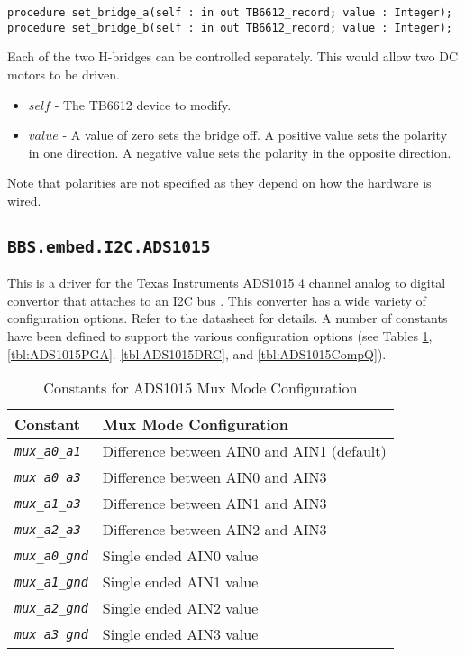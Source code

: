 \documentclass[10pt, openany]{book}
\newcommand{\package}[1]{\texttt{#1}}
\newcommand{\constant}[1]{\emph{\texttt{#1}}}
\begin{document}
\begin{lstlisting}
procedure set_bridge_a(self : in out TB6612_record; value : Integer);
procedure set_bridge_b(self : in out TB6612_record; value : Integer);
\end{lstlisting}
Each of the two H-bridges can be controlled separately.  This would allow two DC motors to be driven.
\begin{itemize}
  \item $self$ - The TB6612 device to modify.
  \item $value$ - A value of zero sets the bridge off.  A positive value sets the polarity in one direction.  A negative value sets the polarity in the opposite direction.
\end{itemize}

Note that polarities are not specified as they depend on how the hardware is wired.

\subsection{\package{BBS.embed.I2C.ADS1015}}
This is a driver for the Texas Instruments ADS1015 4 channel analog to digital convertor that attaches to an I2C bus \cite{ADS1015}.  This converter has a wide variety of configuration options.  Refer to the datasheet for details.  A number of constants have been defined to support the various configuration options (see Tables \ref{tbl:ADS1015mux}, \ref{tbl:ADS1015PGA}. \ref{tbl:ADS1015DRC}, and \ref{tbl:ADS1015CompQ}).

\begin{table}[!h]
\begin{center}
  \begin{tabular}{l|l}
    Constant & Mux Mode Configuration \\
    \hline
    \constant{mux\_a0\_a1} & Difference between AIN0 and AIN1 (default) \\
    \constant{mux\_a0\_a3} & Difference between AIN0 and AIN3 \\
    \constant{mux\_a1\_a3} & Difference between AIN1 and AIN3 \\
    \constant{mux\_a2\_a3} & Difference between AIN2 and AIN3 \\
    \constant{mux\_a0\_gnd} & Single ended AIN0 value \\
    \constant{mux\_a1\_gnd} & Single ended AIN1 value \\
    \constant{mux\_a2\_gnd} & Single ended AIN2 value \\
    \constant{mux\_a3\_gnd} & Single ended AIN3 value \\
  \end{tabular}
  \caption{Constants for ADS1015 Mux Mode Configuration}
  \label{tbl:ADS1015mux}
\end{center}
\end{table}
\end{document}
